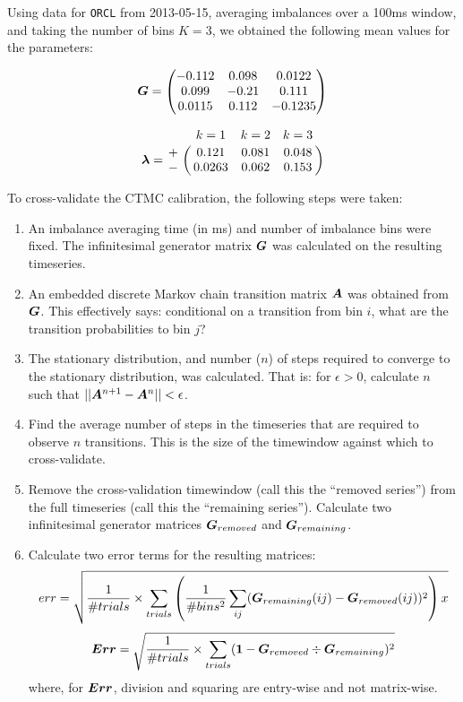Using data for \texttt{ORCL} from 2013-05-15, averaging imbalances over a 100ms window, and taking the number
of bins $K=3$, we obtained the following mean values for the parameters:

\[ \boldsymbol{G} = \begin{pmatrix} -0.112 & 0.098 & 0.0122 \\
							0.099 & -0.21 & 0.111 \\
							0.0115 & 0.112 & -0.1235 \end{pmatrix} \]
							
\[ \mat{\lambda} = \bordermatrix{  & k=1    & k=2   & k=3   \cr
								+ & 0.121  & 0.081 & 0.048 \cr
								- & 0.0263 & 0.062 & 0.153 } \]

To cross-validate the CTMC calibration, the following steps were taken:
\begin{enumerate}
\item An imbalance averaging time (in ms) and number of imbalance bins were fixed. The infinitesimal generator matrix $\boldsymbol{G}$ was calculated on the resulting timeseries. 
\item An embedded discrete Markov chain transition matrix $\boldsymbol{A}$ was obtained from $\boldsymbol{G}$. This effectively says: conditional on a transition from bin $i$, what are the transition probabilities to bin $j$?
\item The stationary distribution, and number ($n$) of steps required to converge to the stationary distribution, was calculated. That is: for $\epsilon > 0$, calculate $n$ such that $||\boldsymbol{A}^{n+1} - \boldsymbol{A}^n|| < \epsilon$.
\item Find the average number of steps in the timeseries that are required to observe $n$ transitions. This is the size of the timewindow against which to cross-validate. 
\item Remove the cross-validation timewindow (call this the ``removed series'') from the full timeseries (call this the ``remaining series''). Calculate two infinitesimal generator matrices $\boldsymbol{G}_{removed}$ and $\boldsymbol{G}_{remaining}$.
\item Calculate two error terms for the resulting matrices:
$$err = \sqrt{\dfrac{1}{\#trials} \times \sum\limits_{trials} \left( \dfrac{1}{\#bins^2} \sum\limits_{ij} (\boldsymbol{G}_{remaining}(ij) - \boldsymbol{G}_{removed}(ij))^2 \right)x} $$
$$\boldsymbol{Err} = \sqrt{\dfrac{1}{\#trials} \times \sum\limits_{trials} (\boldsymbol{1} - \boldsymbol{G}_{removed} \div \boldsymbol{G}_{remaining})^2 }$$
where, for $\boldsymbol{Err}$, division and squaring are entry-wise and not matrix-wise.
\end{enumerate}

